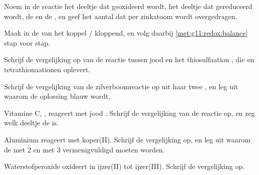 \begin{exercise}[$\star$]\label{exo:g11:redox:5}
Noem in de reactie  het deeltje dat
geoxideerd wordt, het deeltje dat gereduceerd wordt, de  en de
, en geef het aantal  dat per zinkatoom wordt
overgedragen.
\end{exercise}

\begin{exercise}[$\star\star$]\label{exo:g11:redox:6}
Maak in  de  van het koppel /
kloppend, en volg daarbij \cref{met:g11:redox:balance} stap voor
stap.
\end{exercise}

\begin{exercise}[$\star\star$]\label{exo:g11:redox:7}
Schrijf de vergelijking op van de reactie tussen jood  en het
thiosulfaation , die  en tetrathionaationen
 oplevert.
\end{exercise}

\begin{exercise}[$\star\star$]\label{exo:g11:redox:8}
Schrijf de vergelijking van de zilverboomreactie op uit haar twee
, en leg uit waarom de oplossing blauw wordt.
\end{exercise}

\begin{exercise}[$\star\star$]\label{exo:g11:redox:9}
Vitamine C, , reageert met jood . Schrijf de
vergelijking van de reactie op, en zeg welk deeltje de  is.
\end{exercise}

\begin{exercise}[$\star\star$]\label{exo:g11:redox:10}
Aluminium reageert met koper(II). Schrijf de vergelijking op, en leg
uit waarom de  met 2 en met 3 vermenigvuldigd moeten worden.
\end{exercise}

\begin{exercise}[$\star\star$]\label{exo:g11:redox:11}
Waterstofperoxide oxideert in  ijzer(II) tot
ijzer(III). Schrijf de vergelijking op.
\end{exercise}


